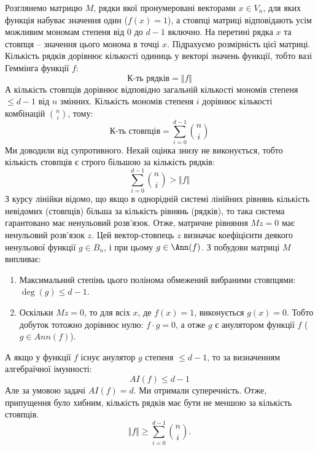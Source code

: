 Розглянемо матрицю $M$, рядки якої пронумеровані векторами $x \in V_{n}$, для яких функція набуває значення 
один ($f(x) = 1$), а стовпці матриці відповідають усім можливим мономам степеня від $0$ до $d-1$ включно. На 
перетині рядка $x$ та стовпця -- значення цього монома в точці $x$. Підрахуємо розмірність цієї матриці. 
Кількість рядків дорівнює кількості одиниць у векторі значень функції, тобто вазі Геммінга функції $f$:
\begin{equation*}
    \text{К-ть рядків} = \Vert f \Vert
\end{equation*}
А кількість стовпців дорівнює відповідно загальній кількості мономів степеня $\leq d-1$ від $n$ змінних. Кількість 
мономів степеня $i$ дорівнює кількості комбінацій $\binom{n}{i}$, тому:
\begin{equation*}
    \text{К-ть стовпців} = \sum\limits_{i=0}^{d-1} \binom{n}{i}
\end{equation*}
Ми доводили від супротивного. Нехай оцінка знизу не виконується, тобто кількість стовпців є строго більшою за кількість 
рядків:
\begin{equation*}
    \sum\limits_{i=0}^{d-1} \binom{n}{i} > \Vert f \Vert
\end{equation*}
З курсу лінійки відомо, що якщо в однорідній системі лінійних рівнянь кількість невідомих (стовпців) більша за кількість 
рівнянь (рядків), то така система гарантовано має ненульовий розв'язок. Отже, матричне рівняння $Mz = 0$ має ненульовий 
розв'язок $z$. Цей вектор-стовпець $z$ визначає коефіцієнти деякого ненульової функції $g \in B_{n}$, і при цьому 
$g \in \Ann(f)$. З побудови матриці $M$ випливає:
\begin{enumerate}
    \item Максимальний степінь цього полінома обмежений вибраними стовпцями: $\deg(g) \leq d-1$.
    \item Оскільки $Mz = 0$, то для всіх $x$, де $f(x)=1$, виконується $g(x) = 0$. Тобто добуток тотожно дорівнює нулю: 
        $f \cdot g = 0$, а отже $g$ є анулятором функції $f$ ($g \in Ann(f)$).
\end{enumerate}
А якщо у функції $f$ існує анулятор $g$ степеня $\leq d-1$, то за визначенням алгебраїчної імунності:
\begin{equation*}
    AI(f) \leq d-1
\end{equation*}
Але за умовою задачі $AI(f) = d$. Ми отримали суперечність. Отже, припущення було хибним, кількість рядків має 
бути не меншою за кількість стовпців.
\begin{equation*}
    \Vert f \Vert \geq \sum\limits_{i=0}^{d-1} \binom{n}{i}.
\end{equation*}

